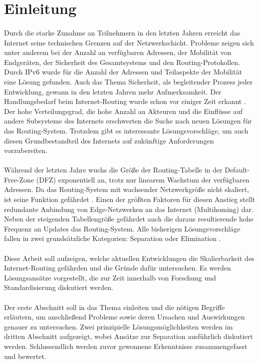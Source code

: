 \section{Einleitung}

\paragraph{}
Durch die starke Zunahme an Teilnehmern in den letzten Jahren erreicht das Internet seine technischen Grenzen auf der Netzwerkschicht. Probleme zeigen sich unter anderem bei der Anzahl an verfügbaren Adressen, der Mobilität von Endgeräten, der Sicherheit des Gesamtsystems und den Routing-Protokollen. Durch IPv6 wurde für die Anzahl der Adressen und Teilaspekte der Mobilität eine Lösung gefunden. Auch das Thema Sicherheit, als begleitender Prozess jeder Entwicklung, gewann in den letzten Jahren mehr Aufmerksamkeit. Der Handlungsbedarf beim Internet-Routing wurde schon vor einiger Zeit erkannt \cite{deering:1996:map}. Der hohe Verteilungsgrad, die hohe Anzahl an Akteuren und die Einflüsse auf andere Subsysteme des Internets erschwerten die Suche nach neuen Lösungen für das Routing-System. Trotzdem gibt es interessante Lösungsvorschläge, um auch diesen Grundbestandteil des Internets auf zukünftige Anforderungen vorzubereiten. 

\paragraph{} 
Während der letzten Jahre wuchs die Größe der Routing-Tabelle in der Default-Free-Zone (DFZ) exponentiell an, trotz nur linearem Wachstum der verfügbaren Adressen\cite{huston:2001:analyzing}. Da das Routing-System mit wachsender Netzwerkgröße nicht skaliert, ist seine Funktion gefährdet \cite{jen:2008:start}. Einen der größten Faktoren für diesen Anstieg stellt redundante Anbindung von Edge-Netzwerken an das Internet (Multihoming) dar. Neben der steigenden Tabellengröße gefährdet auch die daraus resultierende hohe Frequenz an Updates das Rout\-ing-System. Alle bisherigen Lösungsvorschläge fallen in zwei grundsätzliche Kategorien: Separation oder Elimination \cite{jen:2008:start}. 

\paragraph{}
Diese Arbeit soll aufzeigen, welche aktuellen Entwicklungen die Skalierbarkeit des Internet-Routing gefährden und die Gründe dafür untersuchen. Es werden Lösungsansätze vorgestellt, die zur Zeit innerhalb von Forschung und Standardisierung diskutiert werden.

\paragraph{}
Der erste Abschnitt soll in das Thema einleiten und die nötigen Begriffe erläutern, um anschließend Probleme sowie deren Ursachen und Auswirkungen genauer zu untersuchen. Zwei prinzipielle Lösungsmöglichkeiten werden im dritten Abschnitt aufgezeigt, wobei Ansätze zur Separation ausführlich diskutiert werden. Schlussendlich werden zuvor gewonnene Erkenntnisse zusammengefasst und bewertet.

 
